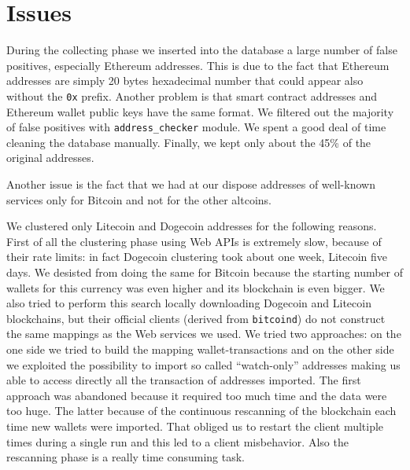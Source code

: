 \section{Issues} \label{sec:issues}
During the collecting phase we inserted into the database a large number of
false positives, especially Ethereum addresses. This is due to the fact that
Ethereum addresses are simply 20 bytes hexadecimal number that could appear
also without the \texttt{0x} prefix. Another problem is that smart contract
addresses and Ethereum wallet public keys have the same format. We filtered out
the majority of false positives with \texttt{address\_checker} module. We spent
a good deal of time cleaning the database manually. Finally, we kept only about
the 45\% of the original addresses. 

Another issue is the fact that we had at our dispose addresses
of well-known services only for Bitcoin and not for the other altcoins.

We clustered only Litecoin and Dogecoin addresses for the following reasons.
First of all the clustering phase using Web APIs is extremely slow, because of
their rate limits: in fact Dogecoin clustering took about one week, Litecoin
five days.
We desisted from doing the same for Bitcoin because the starting number of
wallets for this currency was even higher and its blockchain is even bigger. We
also tried to perform this search locally downloading Dogecoin and Litecoin
blockchains, but their official clients (derived from \texttt{bitcoind}) do not
construct the same mappings as the Web services we used. We tried two
approaches: on the one side we tried to build the mapping wallet-transactions
and on the other side we exploited the possibility to import so called
``watch-only'' addresses making us able to access directly all the transaction
of addresses imported. The first approach was abandoned because it
required too much time and the data were too huge. The latter because of the
continuous rescanning of the blockchain each time new wallets were imported.
That obliged us to restart the client multiple times during a single run and
this led to a client misbehavior. Also the rescanning phase is a really
time consuming task.
